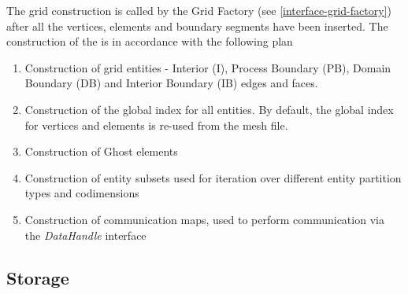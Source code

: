 
The grid construction is called by the Grid Factory (see \ref{interface-grid-factory}) after all the vertices, elements and boundary segments have been inserted. The construction of the \curvgrid{} is in accordance with the following plan

\begin{mybox}
\begin{enumerate}
	\item Construction of grid entities - Interior (I), Process Boundary (PB), Domain Boundary (DB) and Interior Boundary (IB) edges and faces.
	\item Construction of the global index for all entities. By default, the global index for vertices and elements is re-used from the mesh file.
	\item Construction of Ghost elements
	\item Construction of entity subsets used for iteration over different entity partition types and codimensions
	\item Construction of communication maps, used to perform communication via the \textit{DataHandle} interface
\end{enumerate}
\end{mybox}


\subsection{Storage}
\label{impl-grid-storage}

